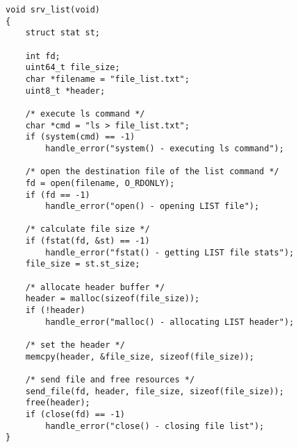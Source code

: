 \begin{lstlisting}[title=srvcmd.c]
void srv_list(void)
{
    struct stat st;

    int fd;
    uint64_t file_size;
    char *filename = "file_list.txt";
    uint8_t *header;

	/* execute ls command */
    char *cmd = "ls > file_list.txt";
    if (system(cmd) == -1)
        handle_error("system() - executing ls command");

    /* open the destination file of the list command */
    fd = open(filename, O_RDONLY);
    if (fd == -1)
        handle_error("open() - opening LIST file");

    /* calculate file size */
    if (fstat(fd, &st) == -1)
        handle_error("fstat() - getting LIST file stats");
    file_size = st.st_size;

    /* allocate header buffer */
    header = malloc(sizeof(file_size));
    if (!header)
        handle_error("malloc() - allocating LIST header");

	/* set the header */
    memcpy(header, &file_size, sizeof(file_size));

	/* send file and free resources */
    send_file(fd, header, file_size, sizeof(file_size));
	free(header);
    if (close(fd) == -1)
        handle_error("close() - closing file list");
}
\end{lstlisting}
